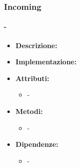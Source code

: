 \subsubsection{Incoming}

\paragraph{-}

\begin{itemize}
    \item \textbf{Descrizione:} 
    \item \textbf{Implementazione:} 
    \item \textbf{Attributi:}
    \begin{itemize}
        \item -
    \end{itemize}
    \item \textbf{Metodi:}
    \begin{itemize}
        \item -
    \end{itemize}
    \item \textbf{Dipendenze:}
    \begin{itemize}
        \item -
    \end{itemize}
\end{itemize}  